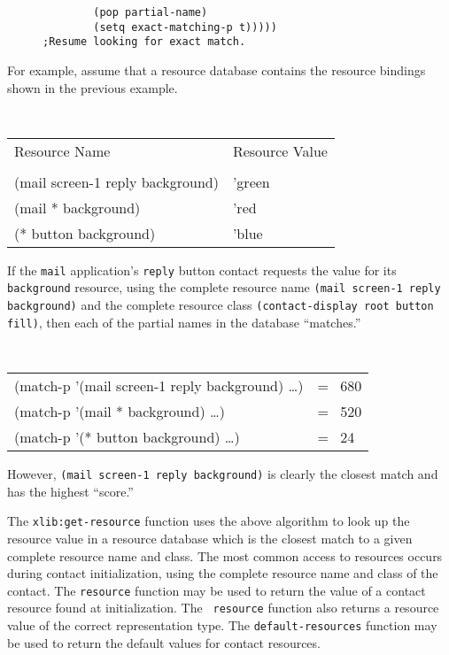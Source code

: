 \documentclass[twoside]{book}
\begin{document}
\begin{sloppy}
\begin{figure}[hb]
\begin{verbatim}
        (pop partial-name)
        (setq exact-matching-p t)))))                   ;Resume looking for exact match.
\end{verbatim}
\end{figure}

For example, assume that a resource database contains the 
resource bindings shown in the previous example.

\begin{center}
\tt
\begin{tabular}{ll}
{\rm Resource Name} & {\rm Resource Value}\\
\\
(mail screen-1 reply background) & 'green\\
(mail * background)       & 'red\\
(* button background)     & 'blue
\end{tabular}
\rm
\end{center}

If the {\tt mail} application's {\tt reply} button contact requests the
value for its {\tt background} resource, using the complete resource
name {\tt (mail screen-1 reply background)} and the complete resource
class  {\tt (contact-display root button fill)}, then
each of the partial names in the database ``matches.''

\begin{center}
\tt
\begin{tabular}{ll}
(match-p '(mail screen-1 reply background) \ldots) & = \ 680\\
(match-p '(mail * background) \ldots)       & = \ 520\\
(match-p '(* button background) \ldots)     & = \ 24
\end{tabular}
\rm
\end{center}

However, {\tt (mail screen-1 reply background)} is clearly the closest match and
has the highest ``score.''

The {\tt xlib:get-resource} function uses the above algorithm to look up the
resource value in a resource database which is the closest match to a given
complete resource name and class.
The most common access to resources occurs during contact initialization, using
the complete resource name and class of the contact. The {\tt resource} function
may be used to return the value of a contact resource found at  initialization. The {\tt
resource} function also returns a resource value of the correct
representation type. The {\tt default-resources} function may be used to return
the default values for contact resources.


\end{sloppy}
\end{document}

